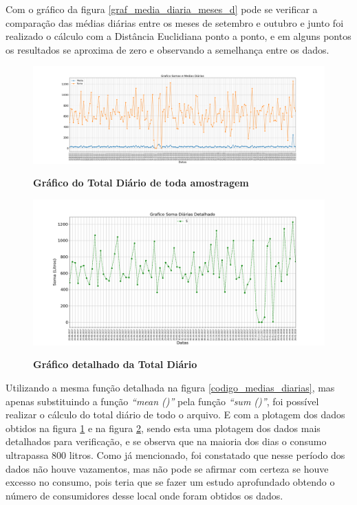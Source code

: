 \par Com o gráfico da figura \ref{graf_media_diaria_meses_d} pode se verificar a comparação das médias diárias entre os meses de setembro e outubro e junto foi realizado o cálculo com a Distância Euclidiana ponto a ponto, e em alguns pontos os resultados se aproxima de zero e observando a semelhança entre os dados.   

\begin{figure}[ht]
	\caption{\textbf{Gráfico do Total Diário de toda amostragem}}
	\centering
		\includegraphics[width=\textwidth,height=\textheight , keepaspectratio]{figuras/GraficoSomaseMediasDiarias(este)}
		\label{graf_total_diaria}
\end{figure}

\begin{figure}[ht]
	\caption{\textbf{Gráfico detalhado da Total Diário}}
	\centering
		\includegraphics[width=\textwidth,height=\textheight , keepaspectratio]{figuras/GraficoSomaDiarias(estecomzoom)}
		\label{graf_total_diaria_detal}
\end{figure}

\par Utilizando a mesma função detalhada na figura \ref{codigo_medias_diarias}, mas apenas substituindo a função \emph{“mean ()”} pela função \emph{“sum ()”}, foi possível realizar o cálculo do total diário de todo o arquivo. E com a plotagem dos dados obtidos na figura \ref{graf_total_diaria} e na figura \ref{graf_total_diaria_detal}, sendo esta uma plotagem dos dados mais detalhados para verificação, e se observa que na maioria dos dias o consumo ultrapassa 800 litros. Como já mencionado, foi constatado que nesse período dos dados não houve vazamentos, mas não pode se afirmar com certeza se houve excesso no consumo, pois teria que se fazer um estudo aprofundado obtendo o número de consumidores desse local onde foram obtidos os dados.  

